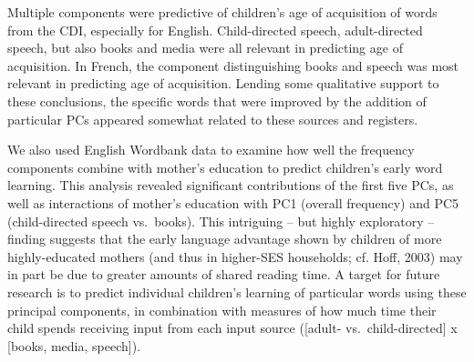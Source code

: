 \documentclass[10pt, letterpaper]{article}
\begin{document}
Multiple components were predictive of children's age of acquisition of
words from the CDI, especially for English. Child-directed speech,
adult-directed speech, but also books and media were all relevant in
predicting age of acquisition. In French, the component distinguishing
books and speech was most relevant in predicting age of acquisition.
Lending some qualitative support to these conclusions, the specific
words that were improved by the addition of particular PCs appeared
somewhat related to these sources and registers.

We also used English Wordbank data to examine how well the frequency
components combine with mother's education to predict children's early
word learning. This analysis revealed significant contributions of the
first five PCs, as well as interactions of mother's education with PC1
(overall frequency) and PC5 (child-directed speech vs.~books). This
intriguing -- but highly exploratory -- finding suggests that the early
language advantage shown by children of more highly-educated mothers
(and thus in higher-SES households; cf. Hoff, 2003) may in part be due
to greater amounts of shared reading time. A target for future research
is to predict individual children's learning of particular words using
these principal components, in combination with measures of how much
time their child spends receiving input from each input source
({[}adult- vs.~child-directed{]} x {[}books, media, speech{]}).
\end{document}
